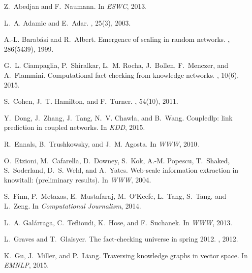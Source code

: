 \documentclass[reprint,twocolumn,showpacs,preprintnumbers,amsmath, aps,pre,amssymb]{revtex4-1}
\begin{document}
\begin{thebibliography}{10}

Z.~Abedjan and F.~Naumann.
\newblock In {\em ESWC}, 2013.

L.~A. Adamic and E.~Adar.
, 25(3), 2003.

A.-L. Barab{\'a}si and R.~Albert.
\newblock Emergence of scaling in random networks.
, 286(5439), 1999.

G.~L. Ciampaglia, P.~Shiralkar, L.~M. Rocha, J.~Bollen, F.~Menczer, and
  A.~Flammini.
\newblock Computational fact checking from knowledge networks.
, 10(6), 2015.

S.~Cohen, J.~T. Hamilton, and F.~Turner.
, 54(10), 2011.

Y.~Dong, J.~Zhang, J.~Tang, N.~V. Chawla, and B.~Wang.
\newblock Coupledlp: link prediction in coupled networks.
\newblock In {\em KDD}, 2015.

R.~Ennals, B.~Trushkowsky, and J.~M. Agosta.
\newblock In {\em WWW}, 2010.

O.~Etzioni, M.~Cafarella, D.~Downey, S.~Kok, A.-M. Popescu, T.~Shaked,
  S.~Soderland, D.~S. Weld, and A.~Yates.
\newblock Web-scale information extraction in knowitall: (preliminary results).
\newblock In {\em WWW}, 2004.

S.~Finn, P.~Metaxas, E.~Mustafaraj, M.~O{\textquoteright}Keefe, L.~Tang,
  S.~Tang, and L.~Zeng.
\newblock In {\em Computational Journalism}, 2014.

L.~A. Gal{\'a}rraga, C.~Teflioudi, K.~Hose, and F.~Suchanek.
\newblock In {\em WWW}, 2013.

L.~Graves and T.~Glaisyer.
\newblock The fact-checking universe in spring 2012.
, 2012.

K.~Gu, J.~Miller, and P.~Liang.
\newblock Traversing knowledge graphs in vector space.
\newblock In {\em EMNLP}, 2015.


\end{thebibliography}
\end{document}

